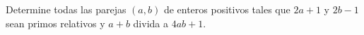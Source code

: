 Determine todas las parejas $(a,b)$ de enteros positivos tales que $2a+1$ y $2b-1$ sean primos relativos y $a+b$ divida a $4ab+1$.
